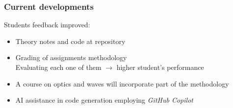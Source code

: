 \documentclass[aspectratio=169]{beamer}
\begin{document}
\begin{frame}
	\frametitle{Current developments}
	\pause
	\begin{block}{}
		\begin{description}[<+->]
			\item [2023] Students feedback improved:
				\begin{itemize}
					\item Theory notes and code at repository
					\item Grading of assignments methodology\\
							Evaluating each one of them \(\rightarrow\) higher student's performance
				\end{itemize}
			\item [2024] 
				\begin{itemize}
					\item A course on optics and waves will incorporate part of the methodology
					\item AI assistance in code generation employing \emph{GitHub Copilot}
				\end{itemize}
		\end{description}
	\end{block}
\end{frame}
\end{document}
